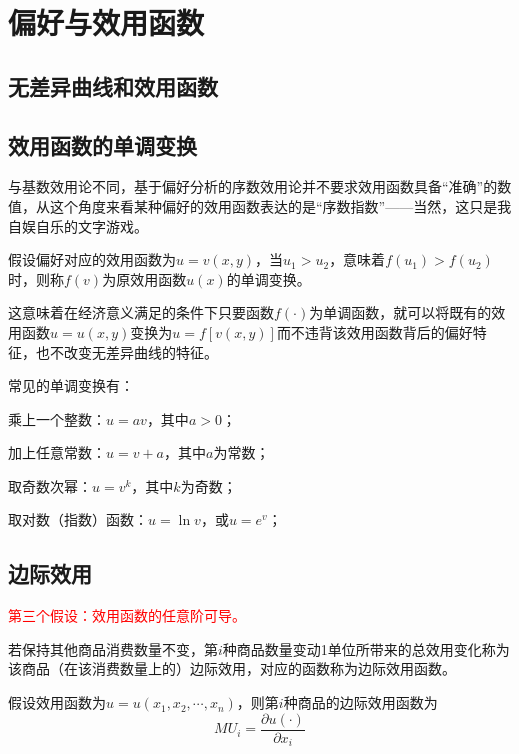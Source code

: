 \chapter{偏好与效用函数}
\label{chp:preferences-and-utility-function}

\section{无差异曲线和效用函数}%

\section{效用函数的单调变换}%
与基数效用论不同，基于偏好分析的序数效用论并不要求效用函数具备“准确”的数值，从这个角度来看某种偏好的效用函数表达的是“序数指数”——当然，这只是我自娱自乐的文字游戏。

假设偏好对应的效用函数为$u=v(x,y)$，当$u_1>u_2$，意味着$f(u_1)>f(u_2)$时，则称$f(v)$为原效用函数$u(x)$的单调变换。

这意味着在经济意义满足的条件下只要函数$f(\cdot)$为单调函数，就可以将既有的效用函数$u=u(x,y)$变换为$u=f[v(x,y)]$而不违背该效用函数背后的偏好特征，也不改变无差异曲线的特征。

常见的单调变换有：
\begin{compactitem}
\item 乘上一个整数：$u=av$，其中$a>0$；
\item 加上任意常数：$u=v+a$，其中$a$为常数；
\item 取奇数次幂：$u=v^k$，其中$k$为奇数；
\item 取对数（指数）函数：$u=\ln v$，或$u=e^v$；
\end{compactitem}

\section{边际效用}

\textcolor{red}{第三个假设：效用函数的任意阶可导。}

若保持其他商品消费数量不变，第$i$种商品数量变动1单位所带来的总效用变化称为该商品（在该消费数量上的）边际效用，对应的函数称为边际效用函数。

假设效用函数为$u=u(x_1,x_2,\cdots,x_n)$，则第$i$种商品的边际效用函数为
\begin{equation}
MU_i=\frac{\partial u(\cdot)}{\partial x_i}
\label{eq:marginal-utility-function}
\end{equation}

